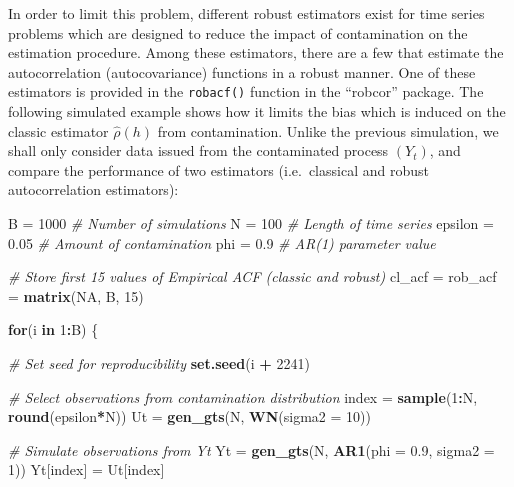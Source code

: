 \documentclass[]{book}
\newenvironment{Shaded}{\begin{snugshade}}{\end{snugshade}}
\newcommand{\CommentTok}[1]{\textcolor[rgb]{0.56,0.35,0.01}{\textit{#1}}}
\newcommand{\ControlFlowTok}[1]{\textcolor[rgb]{0.13,0.29,0.53}{\textbf{#1}}}
\newcommand{\DataTypeTok}[1]{\textcolor[rgb]{0.13,0.29,0.53}{#1}}
\newcommand{\DecValTok}[1]{\textcolor[rgb]{0.00,0.00,0.81}{#1}}
\newcommand{\FloatTok}[1]{\textcolor[rgb]{0.00,0.00,0.81}{#1}}
\newcommand{\KeywordTok}[1]{\textcolor[rgb]{0.13,0.29,0.53}{\textbf{#1}}}
\newcommand{\NormalTok}[1]{#1}
\newcommand{\OperatorTok}[1]{\textcolor[rgb]{0.81,0.36,0.00}{\textbf{#1}}}
\newcommand{\OtherTok}[1]{\textcolor[rgb]{0.56,0.35,0.01}{#1}}
\newcommand{\StringTok}[1]{\textcolor[rgb]{0.31,0.60,0.02}{#1}}
\theoremstyle{definition}
\theoremstyle{definition}
\theoremstyle{definition}
\theoremstyle{remark}
\begin{document}
In order to limit this problem, different robust estimators exist for
time series problems which are designed to reduce the impact of
contamination on the estimation procedure. Among these estimators, there
are a few that estimate the autocorrelation (autocovariance) functions
in a robust manner. One of these estimators is provided in the
\texttt{robacf()} function in the ``robcor'' package. The following
simulated example shows how it limits the bias which is induced on the
classic estimator \(\hat{\rho}(h)\) from contamination. Unlike the
previous simulation, we shall only consider data issued from the
contaminated process \((Y_t)\), and compare the performance of two
estimators (i.e.~classical and robust autocorrelation estimators):

\begin{Shaded}
\begin{Highlighting}[]
\NormalTok{B =}\StringTok{ }\DecValTok{1000} \CommentTok{# Number of simulations}
\NormalTok{N =}\StringTok{ }\DecValTok{100} \CommentTok{# Length of time series}
\NormalTok{epsilon =}\StringTok{ }\FloatTok{0.05} \CommentTok{# Amount of contamination}
\NormalTok{phi =}\StringTok{ }\FloatTok{0.9} \CommentTok{# AR(1) parameter value}

\CommentTok{# Store first 15 values of Empirical ACF (classic and robust)}
\NormalTok{cl_acf =}\StringTok{ }\NormalTok{rob_acf =}\StringTok{ }\KeywordTok{matrix}\NormalTok{(}\OtherTok{NA}\NormalTok{, B, }\DecValTok{15}\NormalTok{)}

\ControlFlowTok{for}\NormalTok{(i }\ControlFlowTok{in} \DecValTok{1}\OperatorTok{:}\NormalTok{B) \{}
  
  \CommentTok{# Set seed for reproducibility}
  \KeywordTok{set.seed}\NormalTok{(i }\OperatorTok{+}\StringTok{ }\DecValTok{2241}\NormalTok{)}

  \CommentTok{# Select observations from contamination distribution}
\NormalTok{  index =}\StringTok{ }\KeywordTok{sample}\NormalTok{(}\DecValTok{1}\OperatorTok{:}\NormalTok{N, }\KeywordTok{round}\NormalTok{(epsilon}\OperatorTok{*}\NormalTok{N))}
\NormalTok{  Ut =}\StringTok{ }\KeywordTok{gen_gts}\NormalTok{(N, }\KeywordTok{WN}\NormalTok{(}\DataTypeTok{sigma2 =} \DecValTok{10}\NormalTok{))}

  \CommentTok{# Simulate observations from  Yt}
\NormalTok{  Yt =}\StringTok{ }\KeywordTok{gen_gts}\NormalTok{(N, }\KeywordTok{AR1}\NormalTok{(}\DataTypeTok{phi =} \FloatTok{0.9}\NormalTok{, }\DataTypeTok{sigma2 =} \DecValTok{1}\NormalTok{))}
\NormalTok{  Yt[index] =}\StringTok{ }\NormalTok{Ut[index]}
  

\end{Highlighting}
\end{Shaded}
\end{document}
